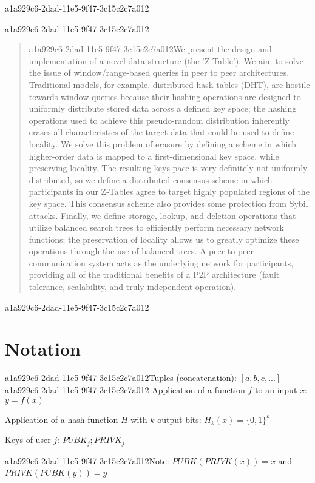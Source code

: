 \documentclass[12pt]{article}
\begin{document}
a1a929c6-2dad-11e5-9f47-3c15c2c7a012
\maketitle

a1a929c6-2dad-11e5-9f47-3c15c2c7a012\begin{abstract}
a1a929c6-2dad-11e5-9f47-3c15c2c7a012We present the design and implementation of a novel data structure (the 'Z-Table'). We aim to solve the issue of window/range-based queries in peer to peer architectures. Traditional models, for example,  distributed hash tables (DHT), are hostile towards window queries because their hashing operations are designed to uniformly distribute stored data across a defined key space; the hashing operations used to achieve this pseudo-random distribution inherently erases all characteristics of the target data that could be used to define locality. We solve this problem of erasure by defining a scheme in which higher-order data is mapped to a first-dimensional key space, while preserving locality. The resulting keys pace is very definitely not uniformly distributed, so we define a distributed consensus scheme in which participants in our Z-Tables agree to target highly populated regions of the key space. This consensus scheme also provides some protection from Sybil attacks. Finally, we define storage, lookup, and deletion operations that utilize balanced search trees to efficiently perform necessary network functions; the preservation of locality allows us to greatly optimize these operations through the use of balanced trees. A peer to peer communication system acts as the underlying network for participants, providing all of the traditional benefits of a P2P architecture (fault tolerance, scalability, and truly independent operation).
\end{abstract}

a1a929c6-2dad-11e5-9f47-3c15c2c7a012\section{Notation}

a1a929c6-2dad-11e5-9f47-3c15c2c7a012Tuples (concatenation): $[a,b,c,...]$
a1a929c6-2dad-11e5-9f47-3c15c2c7a012
Application of a function $f$ to an input $x$: $y=f(x)$

Application of a hash function $H$ with $k$ output bits: $H_{k}(x) = \{0,1\}^k$

Keys of user $j$: $ PUBK_j; PRIVK_j $

a1a929c6-2dad-11e5-9f47-3c15c2c7a012Note: $PUBK(PRIVK(x)) = x$ and $PRIVK(PUBK(y)) = y$~
\end{document}
